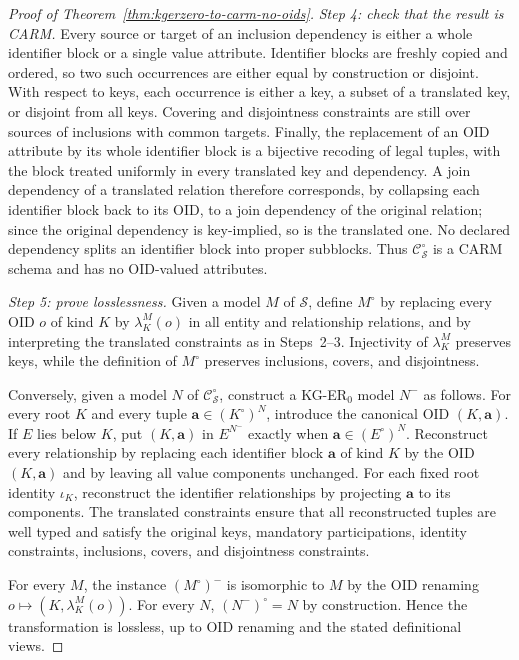 \documentclass[10pt]{article}
\begin{document}
\begin{proof}[Proof of Theorem~\ref{thm:kgerzero-to-carm-no-oids}]
\emph{Step 4: check that the result is \textsf{CARM}.}
Every source or target of an inclusion dependency is either a whole
identifier block or a single value attribute.  Identifier blocks are
freshly copied and ordered, so two such occurrences are either equal by
construction or disjoint.  With respect to keys, each occurrence is
either a key, a subset of a translated key, or disjoint from all keys.
Covering and disjointness constraints are still over sources of
inclusions with common targets.  Finally, the replacement of an OID
attribute by its whole identifier block is a bijective recoding of legal
tuples, with the block treated uniformly in every translated key and
dependency.  A join dependency of a translated relation therefore
corresponds, by collapsing each identifier block back to its OID, to a
join dependency of the original relation; since the original dependency
is key-implied, so is the translated one.  No declared dependency splits
an identifier block into proper subblocks.  Thus
$\mathcal C^\circ_{\mathcal S}$ is a \textsf{CARM} schema and has no
OID-valued attributes.

\emph{Step 5: prove losslessness.}
Given a model $M$ of $\mathcal S$, define $M^\circ$ by replacing every
OID $o$ of kind $K$ by $\lambda^M_K(o)$ in all entity and relationship
relations, and by interpreting the translated constraints as in
Steps~2--3.  Injectivity of $\lambda^M_K$ preserves keys, while the
definition of $M^\circ$ preserves inclusions, covers, and disjointness.

Conversely, given a model $N$ of $\mathcal C^\circ_{\mathcal S}$,
construct a KG-ER$_0$ model $N^{-}$ as follows.  For every root $K$ and
every tuple $\mathbf a\in (K^\circ)^N$, introduce the canonical OID
$(K,\mathbf a)$.  If $E$ lies below $K$, put $(K,\mathbf a)$ in
$E^{N^{-}}$ exactly when $\mathbf a\in (E^\circ)^N$.  Reconstruct every
relationship by replacing each identifier block $\mathbf a$ of kind $K$
by the OID $(K,\mathbf a)$ and by leaving all value components
unchanged.  For each fixed root identity $\iota_K$, reconstruct the
identifier relationships by projecting $\mathbf a$ to its components.
The translated constraints ensure that all reconstructed tuples are
well typed and satisfy the original keys, mandatory participations,
identity constraints, inclusions, covers, and disjointness constraints.

For every $M$, the instance $(M^\circ)^{-}$ is isomorphic to $M$ by the
OID renaming $o\mapsto(K,\lambda^M_K(o))$.  For every $N$,
$(N^{-})^\circ=N$ by construction.  Hence the transformation is
lossless, up to OID renaming and the stated definitional views.
\end{proof}
\end{document}
